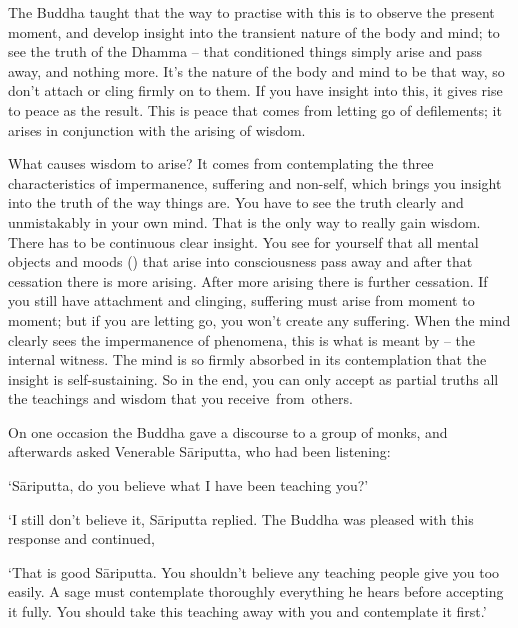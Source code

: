 The Buddha taught that the way to practise with this is to observe the present moment, and develop insight into the transient nature of the body and mind; to see the truth of the Dhamma -- that conditioned things simply arise and pass away, and nothing more. It's the nature of the body and mind to be that way, so don't attach or cling firmly on to them. If you have insight into this, it gives rise to peace as the result. This is peace that comes from letting go of defilements; it arises in conjunction with the arising of wisdom.

What causes wisdom to arise? It comes from contemplating the three characteristics of impermanence, suffering and non-self, which brings you insight into the truth of the way things are. You have to see the truth clearly and unmistakably in your own mind. That is the only way to really gain wisdom. There has to be continuous clear insight. You see for yourself that all mental objects and moods () that arise into consciousness pass away and after that cessation there is more arising. After more arising there is further cessation. If you still have attachment and clinging, suffering must arise from moment to moment; but if you are letting go, you won't create any suffering. When the mind clearly sees the impermanence of phenomena, this is what is meant by  -- the internal witness. The mind is so firmly absorbed in its contemplation that the insight is self-sustaining. So in the end, you can only accept as partial truths all the teachings and wisdom that you \mbox{receive from others.}

On one occasion the Buddha gave a discourse to a group of monks, and afterwards asked Venerable S\=ariputta, who had been listening:

`S\=ariputta, do you believe what I have been teaching you?'

`I still don't believe it,  S\=ariputta replied. The Buddha was pleased with this response and continued,

`That is good S\=ariputta. You shouldn't believe any teaching people give you too easily. A sage must contemplate thoroughly everything he hears before accepting it fully. You should take this teaching away with you and contemplate it first.'

